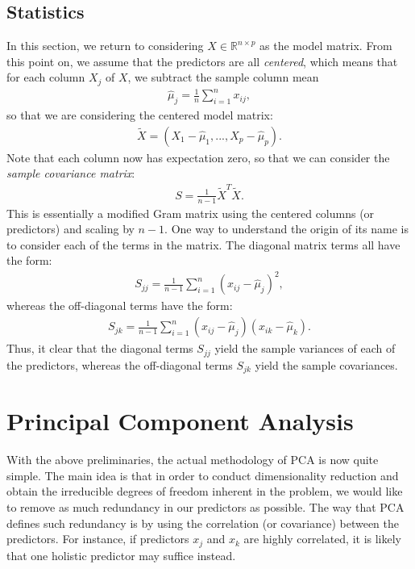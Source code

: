 \documentclass[12pt,letterpaper]{article}
\newcommand{\Rset}{\mathbb{R}}
\newcommand{\sumi}{{\sum_{i=1}^n}}
\begin{document}
\subsection{Statistics}

In this section, we return to considering $X\in \Rset^{n\times p}$ as the model matrix. From this point on, we assume that the predictors are all \emph{centered}, which means that for each column $X_j$ of $X$, we subtract the sample column mean
\begin{align}
\hat \mu_j = \frac{1}{n} \sumi x_{ij},
\end{align}
so that we are considering the centered model matrix:
\begin{align}
\tilde X =  \left( X_1-\hat \mu_1, ..., X_p-\hat \mu_p \right). 
\end{align}
Note that each column now has expectation zero, so that we can consider the \emph{sample covariance matrix}:
\begin{align}
S = \frac{1}{n-1} \tilde{X}^T \tilde{X}.
\end{align}
This is essentially a modified Gram matrix using the centered columns (or predictors) and scaling by  $n-1$. One way to understand the origin of its name is to consider each of the terms in the matrix. The diagonal matrix terms  all have the form:
\begin{align}
S_{jj} = \frac{1}{n-1}\sumi (x_{ij} - \hat \mu_j)^2 ,
\end{align}
whereas the off-diagonal terms have the form:
\begin{align}
S_{jk} = \frac{1}{n-1}\sumi (x_{ij} - \hat \mu_j)(x_{ik} - \hat \mu_k) .
\end{align}
Thus, it clear that the diagonal terms $S_{jj}$ yield the sample variances of each of the predictors, whereas the off-diagonal terms $S_{jk}$ yield the sample covariances.

\section{Principal Component Analysis}
\label{sec:pca}
With the above preliminaries, the actual methodology of PCA is now quite simple. The main idea is that in order to conduct dimensionality reduction and obtain the irreducible degrees of freedom inherent in the problem, we would like to remove as much redundancy in our predictors as possible. The way that PCA defines such redundancy is by using the correlation (or covariance) between the predictors. For instance, if predictors $x_j$ and $x_k$ are highly correlated, it is likely
that one holistic predictor may suffice instead.
\end{document}
